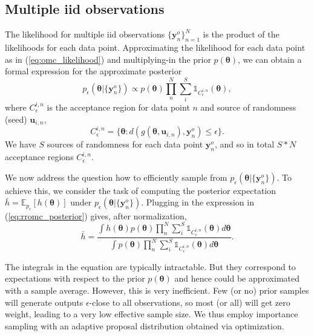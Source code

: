 \documentclass[twoside]{article}
\newcommand{\thb}{\boldsymbol{\theta}}
\newcommand{\ub}{\mathbf{u}}
\newcommand{\data}{\mathbf{y}^o}
\newcommand{\E}{\mathbb{E}}
\begin{document}
\subsection{Multiple iid observations}
\label{subsec:multiple-observations}

The likelihood for multiple iid observations $\{\data_n\}_{n=1}^N$ is the product of the likelihoods for each data point. Approximating the likelihood for each data point as in (\ref{eq:omc_likelihood}) and multiplying-in the prior $p(\thb)$, we can obtain a formal expression for the approximate posterior
\begin{equation}
  \label{eq:rromc_posterior}
  p_{\epsilon}(\thb | \{\data_n\}) \propto p(\thb) \prod_{n}^{N} \sum_{i}^S \mathbb{1}_{C_{\epsilon}^{i,n}}(\thb),
\end{equation}
where $C_{\epsilon}^{i,n}$ is the acceptance region for data point $n$ and source of randomness (seed) $\ub_{i,n}$,
\begin{equation}
C_{\epsilon}^{i,n} = \{\thb : d(g(\thb, \ub_{i,n}), \data_n) \leq \epsilon \}.
\end{equation}
We have $S$ sources of randomness for each data point $\data_n$, and so in total $S*N$ acceptance regions $C_{\epsilon}^{i,n}$.

We now address the question how to efficiently sample from $p_{\epsilon}(\thb | \{\data_n\})$. To achieve this, we consider the task of computing the posterior expectation $\bar{h} = \E_{p_{\epsilon}}[h(\thb)]$ under $p_{\epsilon}(\thb | \{\data_n\})$. Plugging in the expression in (\ref{eq:rromc_posterior}) gives, after normalization,
\begin{equation}
  \label{eq:rromc_expectation}
  \bar{h} = \frac{ \int h(\thb) p(\thb) \prod_n^N \sum_i^S \mathbb{1}_{C_{\epsilon}^{i,n}}(\thb) d\thb}{\int p(\thb) \prod_n^N \sum_i^S \mathbb{1}_{C_{\epsilon}^{i,n}}(\thb) d\thb}.
\end{equation}

The integrals in the equation are typically intractable. But they correspond to expectations with respect to the prior $p(\thb)$ and hence could be approximated with a sample average. However, this is very inefficient. Few (or no) prior samples will generate outputs $\epsilon$-close to all observations, so most (or all) will get zero weight, leading to a very low effective sample size. We thus employ importance sampling with an adaptive proposal distribution obtained via optimization. 
\end{document}
